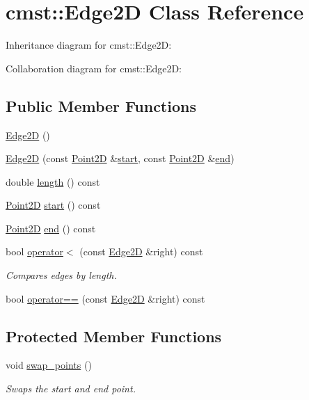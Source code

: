 \hypertarget{classcmst_1_1_edge2_d}{}\section{cmst\+:\+:Edge2D Class Reference}
\label{classcmst_1_1_edge2_d}


Inheritance diagram for cmst\+:\+:Edge2D\+:


Collaboration diagram for cmst\+:\+:Edge2D\+:
\subsection*{Public Member Functions}
\begin{DoxyCompactItemize}
\item 
\hyperlink{classcmst_1_1_edge2_d_a5af466b468749d363692f16de84a85d5}{Edge2D} ()
\item 
\hyperlink{classcmst_1_1_edge2_d_a0d1166315f84757395e889d3225e2ae0}{Edge2D} (const \hyperlink{classcmst_1_1_point2_d}{Point2D} \&\hyperlink{classcmst_1_1_edge2_d_ad77218c63818fe92f43033ba1487ab89}{start}, const \hyperlink{classcmst_1_1_point2_d}{Point2D} \&\hyperlink{classcmst_1_1_edge2_d_af02d43d8344759ac3709d318e26cdcee}{end})
\item 
double \hyperlink{classcmst_1_1_edge2_d_adaa859c8f6b412e1174abe8d8b429ce9}{length} () const 
\item 
\hyperlink{classcmst_1_1_point2_d}{Point2D} \hyperlink{classcmst_1_1_edge2_d_ad77218c63818fe92f43033ba1487ab89}{start} () const 
\item 
\hyperlink{classcmst_1_1_point2_d}{Point2D} \hyperlink{classcmst_1_1_edge2_d_af02d43d8344759ac3709d318e26cdcee}{end} () const 
\item 
bool \hyperlink{classcmst_1_1_edge2_d_ab710dba1b2f0a4c74d01a7b2c1211efa}{operator$<$} (const \hyperlink{classcmst_1_1_edge2_d}{Edge2D} \&right) const 
\begin{DoxyCompactList}\small\item\em Compares edges by length. \end{DoxyCompactList}\item 
bool \hyperlink{classcmst_1_1_edge2_d_a4370b0ab916b4fd8d5ff98733ae57116}{operator==} (const \hyperlink{classcmst_1_1_edge2_d}{Edge2D} \&right) const 
\end{DoxyCompactItemize}
\subsection*{Protected Member Functions}
\begin{DoxyCompactItemize}
\item 
void \hyperlink{classcmst_1_1_edge2_d_aeb88dc66750f6c7967de0918e906abf4}{swap\+\_\+points} ()
\begin{DoxyCompactList}\small\item\em Swaps the start and end point. \end{DoxyCompactList}\end{DoxyCompactItemize}

